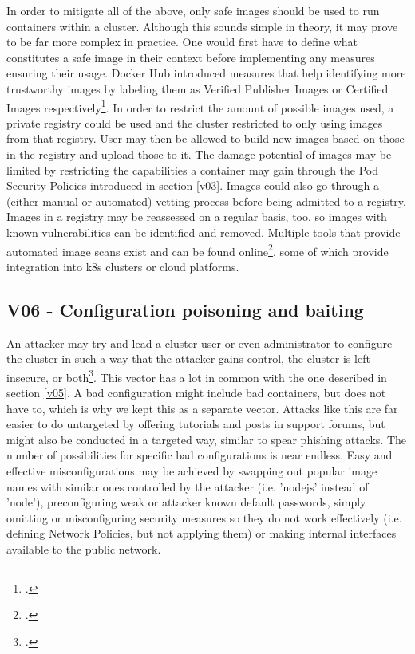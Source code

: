 In order to mitigate all of the above, only safe images should be used to run containers within a cluster. Although this sounds simple in theory, it may prove to be far more complex in practice. One would first have to define what constitutes a safe image in their context before implementing any measures ensuring their usage.
Docker Hub introduced measures that help identifying more trustworthy images by labeling them as Verified Publisher Images or Certified Images respectively\footcite[][, sections 'Verified Publisher Images and Plugins' and 'Certified Images and Plugins']{safeImagesDockerhub}.
In order to restrict the amount of possible images used, a private registry could be used and the cluster restricted to only using images from that registry. User may then be allowed to build new images based on those in the registry and upload those to it. 
The damage potential of images may be limited by restricting the capabilities a container may gain through the Pod Security Policies introduced in section \ref{v03}.
Images could also go through a (either manual or automated) vetting process before being admitted to a registry. Images in a registry may be reassessed on a regular basis, too, so images with known vulnerabilities can be identified and removed. Multiple tools that provide automated image scans exist and can be found online\footcite[][, section 'Securing your container images']{k8sBookWebsite}, some of which provide integration into \gls{k8s} clusters or cloud platforms.

\subsection{V06 - Configuration poisoning and baiting}
An attacker may try and lead a cluster user or even administrator to configure the cluster in such a way that the attacker gains control, the cluster is left insecure, or both\footcite[][, p. 13 to 14]{nistK8s}.
This vector has a lot in common with the one described in section \ref{v05}. A bad configuration might include bad containers, but does not have to, which is why we kept this as a separate vector. Attacks like this are far easier to do untargeted by offering tutorials and posts in support forums, but might also be conducted in a targeted way, similar to spear phishing attacks.
The number of possibilities for specific bad configurations is near endless. Easy and effective misconfigurations may be achieved by swapping out popular image names with similar ones controlled by the attacker (i.e. 'nodejs' instead of 'node'), preconfiguring weak or attacker known default passwords, simply omitting or misconfiguring security measures so they do not work effectively (i.e. defining Network Policies, but not applying them) or making internal interfaces available to the public network.

